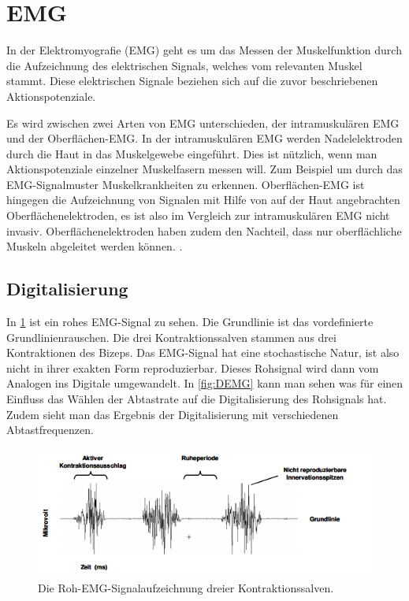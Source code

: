 \section{EMG}
In der Elektromyografie (EMG) geht es um das Messen der Muskelfunktion durch die Aufzeichnung des elektrischen Signals, welches vom relevanten Muskel stammt. Diese elektrischen Signale beziehen sich auf die zuvor beschriebenen Aktionspotenziale. 

Es wird zwischen zwei Arten von EMG unterschieden, der intramuskulären EMG und der Oberflächen-EMG.
In der intramuskulären EMG werden Nadelelektroden durch die Haut in das Muskelgewebe eingeführt. Dies ist nützlich, wenn man Aktionspotenziale einzelner Muskelfasern messen will. Zum Beispiel um durch das EMG-Signalmuster Muskelkrankheiten zu erkennen.
Oberflächen-EMG ist hingegen die Aufzeichnung von Signalen mit Hilfe von auf der Haut angebrachten Oberflächenelektroden, es ist also im Vergleich zur intramuskulären EMG nicht invasiv. Oberflächenelektroden haben zudem den Nachteil, dass nur
oberflächliche Muskeln abgeleitet werden können.   \cite{KonEMG2006-ATO}.

\subsection{Digitalisierung}
In \ref{fig:REMG} ist ein rohes EMG-Signal zu sehen. Die Grundlinie ist das vordefinierte Grundlinienrauschen. Die drei Kontraktionssalven stammen aus drei Kontraktionen des Bizeps. Das EMG-Signal hat eine stochastische Natur, ist also nicht in ihrer exakten Form reproduzierbar. Dieses Rohsignal wird dann vom Analogen ins Digitale umgewandelt. In \ref{fig:DEMG} kann man sehen was für einen Einfluss das Wählen der Abtastrate auf die Digitalisierung des Rohsignals hat. Zudem sieht man das Ergebnis der Digitalisierung mit verschiedenen Abtastfrequenzen. \cite{KonEMG2006-ATO}

\begin{figure}[H]
  \centering
  \includegraphics[width= \linewidth]{RohEMG.png}
  \caption{Die Roh-EMG-Signalaufzeichnung dreier Kontraktionssalven.  \cite{KonEMG2001-ATO}}
  \label{fig:REMG}
\end{figure}

